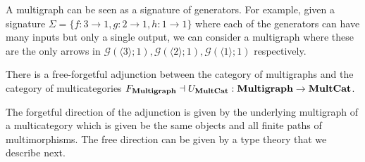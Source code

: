 \begin{remark}
  A multigraph can be seen as a signature of generators.
  For example, given a signature $\Sigma = \{f : 3 \to 1, g : 2 \to 1, h : 1 \to 1\}$ where each of the generators can have many inputs but only a single output, we can consider a multigraph where these are the only arrows in $\mathcal{G}(\langle 3 \rangle; 1), \mathcal{G}(\langle 2 \rangle; 1), \mathcal{G}(\langle 1 \rangle; 1)$ respectively.
\end{remark}

\begin{proposition}
  There is a free-forgetful adjunction between the category of multigraphs and the category of multicategories $F_{\mathbf{Multigraph}} \dashv U_{\mathbf{MultCat}} : \mathbf{Multigraph} \to \mathbf{MultCat}$.
\end{proposition}

The forgetful direction of the adjunction is given by the underlying multigraph of a multicategory which is given be the same objects and all finite paths of multimorphisms.
The free direction can be given by a type theory that we describe next.

